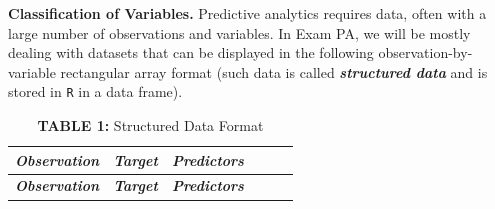 \documentclass[
  10pt,
]{krantz}
\begin{document}
\textbf{Classification of Variables.} Predictive analytics requires data, often with
a large number of observations and variables. In Exam PA, we will be mostly
dealing with datasets that can be displayed in the following
observation-by-variable rectangular array format (such data is called
\textbf{\emph{structured data}} and is stored in \texttt{R} in a data frame).

\begin{longtable}[]{@{}
  >{\centering\arraybackslash}p{}
  >{\centering\arraybackslash}p{}
  >{\centering\arraybackslash}p{}
  >{\centering\arraybackslash}p{}
  >{\centering\arraybackslash}p{}
  >{\centering\arraybackslash}p{}@{}}
\caption{\textbf{TABLE 1:} Structured Data Format}\tabularnewline
\toprule\noalign{}
\begin{minipage}[b]{\linewidth}\centering
\textbf{\emph{Observation}}
\end{minipage} & \begin{minipage}[b]{\linewidth}\centering
\textbf{\emph{Target}}
\end{minipage} & \begin{minipage}[b]{\linewidth}\centering
\textbf{\emph{Predictors}}
\end{minipage} & \begin{minipage}[b]{\linewidth}\centering
\end{minipage} & \begin{minipage}[b]{\linewidth}\centering
\end{minipage} & \begin{minipage}[b]{\linewidth}\centering
\end{minipage} \\
\midrule\noalign{}
\endfirsthead
\toprule\noalign{}
\begin{minipage}[b]{\linewidth}\centering
\textbf{\emph{Observation}}
\end{minipage} & \begin{minipage}[b]{\linewidth}\centering
\textbf{\emph{Target}}
\end{minipage} & \begin{minipage}[b]{\linewidth}\centering
\textbf{\emph{Predictors}}
\end{minipage} & \begin{minipage}[b]{\linewidth}\centering

\end{minipage}
\end{longtable}
\end{document}
